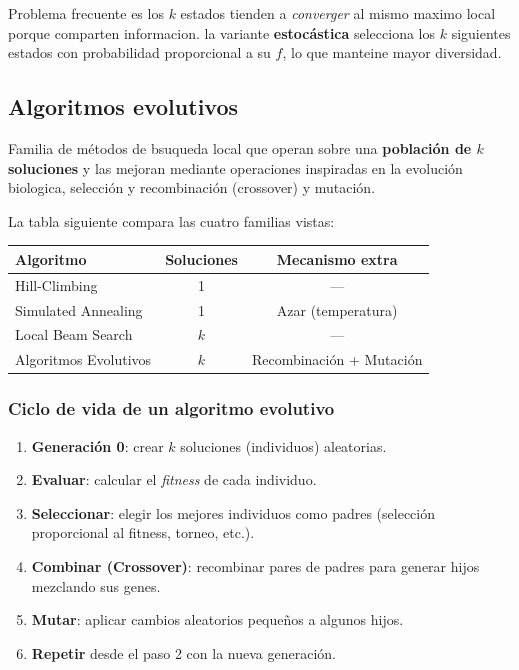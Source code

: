 \medskip
Problema frecuente es los $k$ estados tienden a \emph{converger} al mismo maximo local porque comparten informacion. la variante \textbf{estocástica} selecciona los $k$ siguientes
estados con probabilidad proporcional a su $f$, lo que manteine mayor diversidad.


\subsection{Algoritmos evolutivos}

\begin{definition}
    Familia de métodos de bsuqueda local que operan sobre una \textbf{población de $k$ soluciones} y las mejoran mediante operaciones inspiradas en la
    evolución biologica, selección y recombinación (crossover) y mutación.
\end{definition}


\noindent La tabla siguiente compara las cuatro familias vistas:
 
\begin{center}
\begin{tabular}{lcc}
  \toprule
  Algoritmo & Soluciones & Mecanismo extra \\
  \midrule
  Hill-Climbing       & 1        & ---                      \\
  Simulated Annealing & 1        & Azar (temperatura)       \\
  Local Beam Search   & $k$      & ---                      \\
  Algoritmos Evolutivos & $k$    & Recombinación + Mutación \\
  \bottomrule
\end{tabular}
\end{center}

\subsubsection{Ciclo de vida de un algoritmo evolutivo}

\begin{enumerate}
    \item \textbf{Generación 0}: crear $k$ soluciones (individuos) aleatorias.
    \item \textbf{Evaluar}: calcular el \emph{fitness} de cada individuo.
    \item \textbf{Seleccionar}: elegir los mejores individuos como padres
          (selección proporcional al fitness, torneo, etc.).
    \item \textbf{Combinar (Crossover)}: recombinar pares de padres para
          generar hijos mezclando sus genes.
    \item \textbf{Mutar}: aplicar cambios aleatorios pequeños a algunos hijos.
    \item \textbf{Repetir} desde el paso 2 con la nueva generación.
  \end{enumerate}

